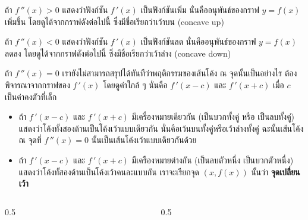 \begin{frame}
ถ้า $f\,''(x) > 0$ แสดงว่าฟังก์ชัน $f\,'(x)$ เป็นฟังก์ชันเพิ่ม นั่นคืออนุพันธ์ของกราฟ $ y = f(x)$ เพิ่มขึ้น โดยดูได้จากกราฟดังต่อไปนี้ ซึ่งมีชื่อเรียกว่าเว้าบน (concave up)
\end{frame}

\begin{frame}
ถ้า $f\,''(x) < 0$ แสดงว่าฟังก์ชัน $f\,'(x)$ เป็นฟังก์ชันลด นั่นคืออนุพันธ์ของกราฟ $y = f(x)$ ลดลง โดยดูได้จากกราฟดังต่อไปนี้ ซึ่งมีชื่อเรียกว่าเว้าล่าง (concave down)
\end{frame}

\begin{frame}[t]
ถ้า $f\,''(x) = 0$ เรายังไม่สามารถสรุปได้ทันทีว่าพฤติกรรมของเส้นโค้ง ณ จุดนั้นเป็นอย่างไร ต้องพิจารณาจากกราฟของ $f\,'(x)$ โดยดูค่าใกล้ ๆ นั่นคือ $f\,'(x-c)$ และ $f\,'(x+c)$ เมื่อ $c$ เป็นค่าคงตัวที่เล็ก
\begin{slide}
\begin{itemize}
\item ถ้า $f\,'(x-c)$ และ $f\,'(x+c)$ มีเครื่องหมายเดียวกัน (เป็นบวกทั้งคู่ หรือ เป็นลบทั้งคู่) แสดงว่าโค้งทั้งสองด้านเป็นโค้งเว้าแบบเดียวกัน นั่นคือเว้นบนทั้งคู่หรือเว้าล่างทั้งคู่ ฉะนั้นเส้นโค้ง ณ จุดที่ $f\,''(x) = 0$ นั้นเป็นเส้นโค้งเว้าแบบเดียวกันด้วย
\item ถ้า $f\,'(x-c)$ และ $f\,'(x+c)$ มีเครืองหมายต่างกัน (เป็นลบตัวหนึ่ง เป็นบวกตัวหนึ่ง) แสดงว่าโค้งทั้สองด้านเป็นโค้งเว้าคนละแบบกัน เราจะเรียกจุด $(x,f(x))$ นั้นว่า \textbf{จุดเปลี่ยนเว้า}
\end{itemize}
\end{slide}
\end{frame}

\begin{frame}
\begin{columns}
\begin{column}{0.5\textwidth}
\end{column}
\begin{column}{0.5\textwidth}
\end{column}
\end{columns}
\end{frame}

